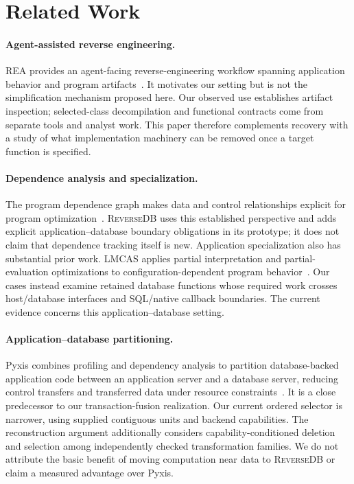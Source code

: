 \documentclass[acmsmall,screen,review,anonymous]{acmart}
\newcommand{\sys}{\textsc{ReverseDB}}
\begin{document}
\section{Related Work}
\label{sec:related}
\paragraph{Agent-assisted reverse engineering.}
REA provides an agent-facing reverse-engineering workflow spanning application
behavior and program artifacts~\cite{rea}. It motivates our setting but is not
the simplification mechanism proposed here. Our observed use establishes
artifact inspection; selected-class decompilation and functional contracts
come from separate tools and analyst work. This paper therefore complements
recovery with a study of what implementation machinery can be removed once a
target function is specified.

\paragraph{Dependence analysis and specialization.}
The program dependence graph makes data and control relationships explicit
for program optimization~\cite{pdg}. \sys{} uses this established perspective
and adds explicit application--database boundary obligations in its prototype;
it does not claim that dependence tracking itself is new. Application
specialization also has substantial prior work. LMCAS applies partial
interpretation and partial-evaluation optimizations to configuration-dependent
program behavior~\cite{lmcas}. Our cases instead examine retained database
functions whose required work crosses host/database interfaces and SQL/native
callback boundaries. The current evidence concerns this application--database setting.

\paragraph{Application--database partitioning.}
Pyxis combines profiling and dependency analysis to partition database-backed
application code between an application server and a database server, reducing
control transfers and transferred data under resource constraints~\cite{pyxis}.
It is a close predecessor to our transaction-fusion realization. Our current
ordered selector is narrower, using supplied contiguous units and backend
capabilities. The reconstruction argument additionally considers capability-conditioned deletion
and selection among independently checked transformation families. We do not attribute
the basic benefit of moving computation near data to \sys{} or claim a
measured advantage over Pyxis.
\end{document}
